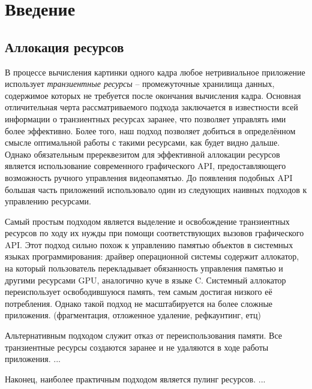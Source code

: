 \section{Введение}

\subsection{Аллокация ресурсов}
В процессе вычисления картинки одного кадра любое нетривиальное приложение использует \textit{транзиентные ресурсы} -- промежуточные хранилища данных, содержимое которых не требуется после окончания вычисления кадра. Основная отличительная черта рассматриваемого подхода заключается в известности всей информации о транзиентных ресурсах заранее, что позволяет управлять ими более эффективно. Более того, наш подход позволяет добиться в определённом смысле оптимальной работы с такими ресурсами, как будет видно дальше. Однако обязательным пререквезитом для эффективной аллокации ресурсов является использование современного графического API, предоставляющего возможность ручного управления видеопамятью. До появления подобных API большая часть приложений использовало один из следующих наивных подходов к управлению ресурсами.

Самый простым подходом является выделение и освобождение транзиентных ресурсов по ходу их нужды при помощи соответствующих вызовов графического API. Этот подход сильно похож к управлению памятью объектов в системных языках программирования: драйвер операционной системы содержит аллокатор, на который пользователь перекладывает обязанность управления памятью и другими ресурсами GPU, аналогично куче в языке C. Системный аллокатор переиспользует освободившуюся память, тем самым достигая низкого её потребления. Однако такой подход не масштабируется на более сложные приложения. (фрагментация, отложенное удаление, рефкаунтинг, етц)

Альтернативным подходом служит отказ от переиспользования памяти. Все транзиентные ресурсы создаются заранее и не удаляются в ходе работы приложения. ...

Наконец, наиболее практичным подходом является пулинг ресурсов. ...
